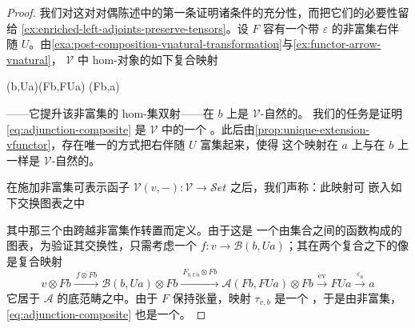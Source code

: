 \begin{proof}
我们对这对对偶陈述中的第一条证明诸条件的充分性，而把它们的必要性留给%
\cref{ex:enriched-left-adjoints-preserve-tensors}。设 $F$ 容有一个带%
\trCounit{} $\varepsilon$ 的非富集右伴随 $U$。由\cref{exa:post-composition-vnatural-transformation}与\cref{ex:functor-arrow-vnatural}，
$\mathcal{V}$ 中 hom-对象的如下复合映射
\begin{rveq}\label{eq:adjunction-composite}
(b,Ua)(Fb,FUa)
   (Fb,a)
\end{rveq}
——它提升该非富集\trAdjunction{}的 hom-集双射——在 $b$ 上是 $\mathcal{V}$-自然的。
我们的任务是证明 \eqref{eq:adjunction-composite} 是 $\mathcal{V}$ 中的一个%
\trIsomorphism。此后由\cref{prop:unique-extension-vfunctor}，存在唯一的方式把右伴随 $U$ 富集起来，使得
这个映射在 $a$ 上与在 $b$ 上一样是 $\mathcal{V}$-自然的。

在施加非富集可表示函子
$\mathcal{V}(v,-)\colon\mathcal{V}\to\mathcal{S}et$ 之后，我们声称：此映射可
嵌入如下交换图表之中
\begin{center}
\end{center}
其中那三个\trIsomorphism{}由跨越非富集\trAdjunction{}作转置而定义。由于这是
一个由集合之间的函数构成的图表，为验证其交换性，只需考虑一个\trElement{}
$f\colon v\to\mathcal{B}(b,Ua)$；其在两个复合之下的像是复合映射
\[ v\otimes Fb\xrightarrow{\ f\otimes Fb\ }\mathcal{B}(b,Ua)\otimes Fb
   \xrightarrow{\ F_{b,Ua}\otimes Fb\ }\mathcal{A}(Fb,FUa)\otimes Fb
   \xrightarrow{\ \mathrm{ev}\ }FUa\xrightarrow{\ \varepsilon_{a}\ }a \]
它居于 $\mathcal{A}$ 的底范畴之中。由于 $F$ 保持张量，映射 $\tau_{v,b}$ 是一个%
\trIsomorphism，于是由非富集\trYonedaLemma，\eqref{eq:adjunction-composite}
也是一个\trIsomorphism。
\end{proof}

